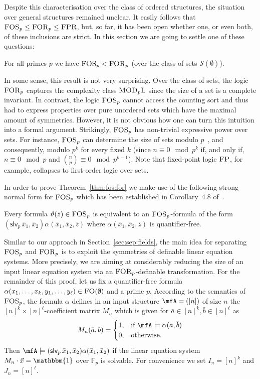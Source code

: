 \documentclass[a4paper,UKenglish]{lipics}
\newcommand{\inseg}[1]{\ensuremath{[#1]}}
\newcommand{\field}[1]{\mathbb{#1}}
\newcommand{\onevec}{\ensuremath{\mathbbm{1}}}
\newcommand{\Str}{\ensuremath{\mathscr{S}}}
\newcommand{\logic}[1]{\ensuremath{\textsc{#1}}\xspace}
\newcommand{\FO}{\logic{FO}}
\newcommand{\FP}{\logic{FP}}
\newcommand{\FPRK}{\logic{FPR}}
\newcommand{\FOSp}{\ensuremath{\logic{FOS}_p}\xspace}
\newcommand{\FOSx}[1]{\ensuremath{\logic{FOS}_{#1}}\xspace}
\newcommand{\FORp}{\ensuremath{\logic{FOR}_p}\xspace}
\newcommand{\FORx}[1]{\ensuremath{\logic{FOR}_{#1}}\xspace}
\newcommand{\slvp}{\ensuremath{\textsf{slv}_p}\xspace}
\newcommand{\MODLx}[1]{\ensuremath{\textsc{MOD}_{#1}\textsc{L}}\xspace}
\newcommand{\ba}{{\bar a}}
\newcommand{\bb}{{\bar b}}
\newcommand{\bx}{{\bar x}}
\newcommand{\bz}{{\bar z}}
\newcommand{\vct}[1]{\vec{#1}}
\theoremstyle{plain}
\begin{document}
Despite this characterisation over the class of ordered 
structures, the situation over general structures remained unclear. It easily 
follows that $\FOSx{p} \leq \FORx{p} \leq \FPRK$, but, 
so far, it 
has been open whether one, or even both, of these inclusions are strict.
In this section we are going to settle one of these questions:

\begin{theorem}
\label{thm:fos:for}
 For all primes $p$ we have $\FOSp < \FORp$ (over the class of sets 
$\Str(\emptyset)$).
\end{theorem}

In some sense, this result is not very surprising. 
Over the class of sets, the logic $\FORp$ captures the complexity class 
$\MODLx{p}$ since the size of a set is a complete invariant.
In contrast, the logic $\FOSp$ cannot access the counting sort 
and thus had to express properties over pure unordered sets which have 
the maximal amount of symmetries.
However, it is not obvious how one can turn this intuition into a formal 
argument. Strikingly, $\FOSp$ has non-trivial expressive 
power over sets. For instance, $\FOSp$ can determine the 
size of sets modulo $p$~\cite{Pa10}, and consequently, modulo $p^k$ for 
every fixed $k$ (since $n \equiv 0 \mod p^k$ if, and only if, 
$n \equiv 0 \mod p$ and ${n \choose p} \equiv 0 \mod p^{k-1}$). 
Note that fixed-point logic $\FP$, for example, collapses to 
first-order logic over sets.

In order to prove Theorem~\ref{thm:fos:for} we make use of the following 
strong normal form for \FOSp which has been established 
in Corollary~4.8 of~\cite{DaGrHoKoPa13}.
\begin{theorem}
\label{thm:normalform:fos}
Every formula $\vartheta(\bz) \in \FOSp$ is equivalent to an 
$\FOSp$-formula of
the form $(\slvp \, \bx_1,\bx_2) \alpha(\bx_1,\bx_2, \bz)$ where 
$\alpha(\bx_1,\bx_2,\bz)$ is quantifier-free.
\end{theorem}


\medskip
Similar to our approach in Section~\ref{sec:sep:fields}, the main idea 
for separating $\FOSp$ and $\FORp$ is to exploit the symmetries of definable 
linear equation systems.
More precisely, we are aiming at considerably reducing the size of an input 
linear equation system via an $\FORp$-definable transformation. For the 
remainder of this proof, let us fix a quantifier-free formula 
$\alpha(x_1, \dots, x_k, y_1, \dots, y_\ell)\in \FO(\emptyset)$ and a 
prime $p$. 
According to the semantics of $\FOSp$, the formula $\alpha$ defines in an
input structure $\mfA= (\inseg{n})$ of size $n$ the $\inseg{n}^k \times
\inseg{n}^\ell$-coefficient
matrix $M_n$ which is given for $\ba \in \inseg{n}^k, \bb \in
\inseg{n}^\ell$ as
\[ M_n(\ba, \bb) = \begin{cases}
                        1, &\text{if } \mfA \models \alpha(\ba, \bb) \\
                        0, &\text{otherwise.}    
                       \end{cases}  \]
Then $\mfA \models (\slvp \, \bx_1,\bx_2) \alpha(\bx_1,\bx_2)$ if the linear
equation system $M_n \cdot \vct x = \onevec$  over $\field F_p$ is solvable.
For convenience we set $I_n = \inseg{n}^k$ and $J_n = \inseg{n}^\ell$. 
\end{document}
